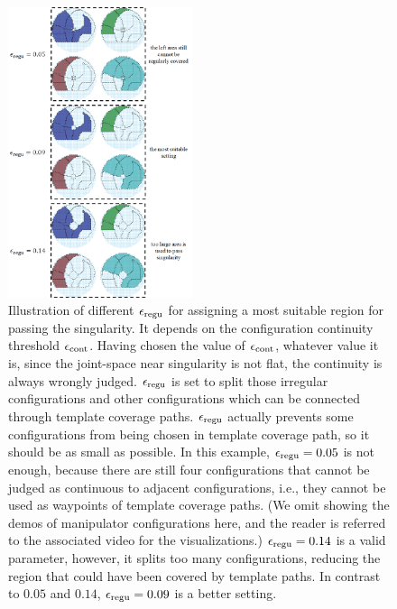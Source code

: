 \documentclass[Afour,sageh,times]{sagej}
\begin{document}
\begin{figure}[t]
\centering
\includegraphics[width = 0.48\textwidth]{figures/exp_central_sphere/choose_threshold_2}
\caption{Illustration of different $\epsilon_{\rm regu}$ for assigning a most suitable region for passing the singularity. It depends on the configuration continuity threshold $\epsilon_{\rm cont}$. 
Having chosen the value of $\epsilon_{\rm cont}$, whatever value it is, since the joint-space near singularity is not flat, the continuity is always wrongly judged. $\epsilon_{\rm regu}$ is set to split those irregular configurations and other configurations which can be connected through template coverage paths. 
$\epsilon_{\rm regu}$ actually prevents some configurations from being chosen in template coverage path, so it should be as small as possible. 
In this example, $\epsilon_{\rm regu} = 0.05$ is not enough, because there are still four configurations that cannot be judged as continuous to adjacent configurations, i.e., they cannot be used as waypoints of template coverage paths. 
(We omit showing the demos of manipulator configurations here, and the reader is referred to the associated video for the visualizations.)
$\epsilon_{\rm regu} = 0.14$ is a valid parameter, however, it splits too many configurations, reducing the region that could have been covered by template paths. In contrast to $0.05$ and $0.14$, $\epsilon_{\rm regu} = 0.09$ is a better setting. 
}\label{fig:choose_threshold}
\end{figure}
\end{document}

